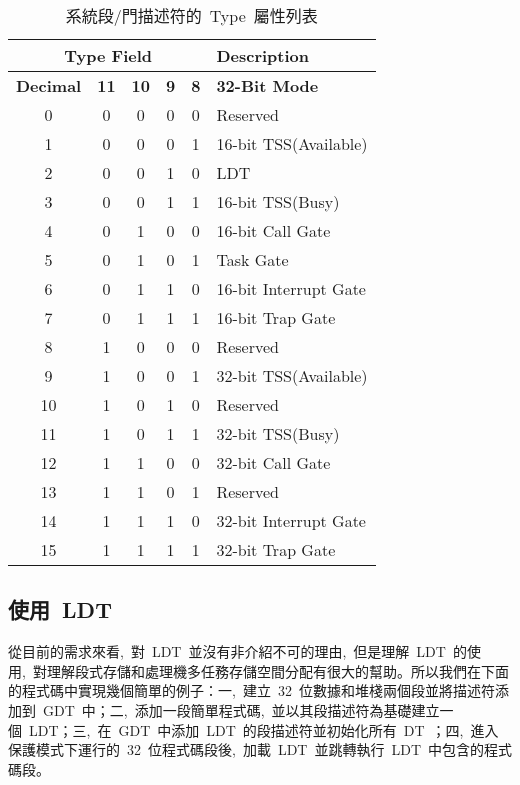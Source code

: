 \begin{itemize}
\begin{center}\begin{longtable}{c|c|c|c|c|l}
\caption[]{系統段/門描述符的~Type~屬性列表}\label{sys_gate_types}\\
\hline
\multicolumn{5}{c|}{\textbf{Type Field}} & \textbf{Description}\bigstrut\\
\hline
\textbf{Decimal} & \textbf{11} & \textbf{10} & \textbf{9} & \textbf{8} & \textbf{32-Bit Mode}\\
\hline
0 & 0 & 0 & 0 & 0 & Reserved\\
1 & 0 & 0 & 0 & 1 & 16-bit TSS(Available)\\
2 & 0 & 0 & 1 & 0 & LDT\\
3 & 0 & 0 & 1 & 1 & 16-bit TSS(Busy)\\
4 & 0 & 1 & 0 & 0 & 16-bit Call Gate\\
5 & 0 & 1 & 0 & 1 & Task Gate\\
6 & 0 & 1 & 1 & 0 & 16-bit Interrupt Gate\\
7 & 0 & 1 & 1 & 1 & 16-bit Trap Gate\\
8 & 1 & 0 & 0 & 0 & Reserved\\
9 & 1 & 0 & 0 & 1 & 32-bit TSS(Available)\\
10 & 1 & 0 & 1 & 0 & Reserved\\
11 & 1 & 0 & 1 & 1 & 32-bit TSS(Busy)\\
12 & 1 & 1 & 0 & 0 & 32-bit Call Gate\\
13 & 1 & 1 & 0 & 1 & Reserved\\
14 & 1 & 1 & 1 & 0 & 32-bit Interrupt Gate\\
15 & 1 & 1 & 1 & 1 & 32-bit Trap Gate\\
\hline
\end{longtable}\end{center}

\end{itemize}

\subsection{使用~LDT~}

從目前的需求來看,~對~LDT~並沒有非介紹不可的理由,~但是理解~LDT~的使用,~對理解段式存儲和處理機多任務存儲空間分配有很大的幫助。所以我們在下面的程式碼中實現幾個簡單的例子：一,~建立~32~位數據和堆棧兩個段並將描述符添加到~GDT~中；二,~添加一段簡單程式碼,~並以其段描述符為基礎建立一個~LDT；三,~在~GDT~中添加~LDT~的段描述符並初始化所有~DT~；四,~進入保護模式下運行的~32~位程式碼段後,~加載~LDT~並跳轉執行~LDT~中包含的程式碼段。

